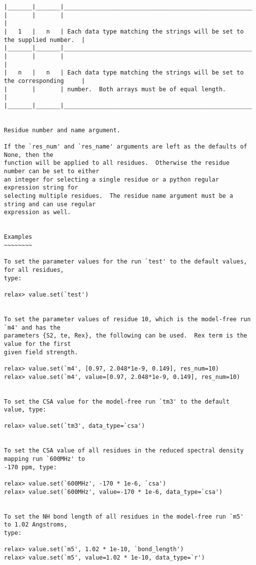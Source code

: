 {\begin{verbatim}
|_______|_______|__________________________________________________________________________|
|       |       |                                                                          |
|   1   |   n   | Each data type matching the strings will be set to the supplied number.  |
|_______|_______|__________________________________________________________________________|
|       |       |                                                                          |
|   n   |   n   | Each data type matching the strings will be set to the corresponding     |
|       |       | number.  Both arrays must be of equal length.                            |
|_______|_______|__________________________________________________________________________|


Residue number and name argument.

If the `res_num' and `res_name' arguments are left as the defaults of None, then the
function will be applied to all residues.  Otherwise the residue number can be set to either
an integer for selecting a single residue or a python regular expression string for
selecting multiple residues.  The residue name argument must be a string and can use regular
expression as well.


Examples
~~~~~~~~

To set the parameter values for the run `test' to the default values, for all residues,
type:

relax> value.set(`test')


To set the parameter values of residue 10, which is the model-free run `m4' and has the
parameters {S2, te, Rex}, the following can be used.  Rex term is the value for the first
given field strength.

relax> value.set(`m4', [0.97, 2.048*1e-9, 0.149], res_num=10)
relax> value.set(`m4', value=[0.97, 2.048*1e-9, 0.149], res_num=10)


To set the CSA value for the model-free run `tm3' to the default value, type:

relax> value.set(`tm3', data_type=`csa')


To set the CSA value of all residues in the reduced spectral density mapping run `600MHz' to
-170 ppm, type:

relax> value.set(`600MHz', -170 * 1e-6, `csa')
relax> value.set(`600MHz', value=-170 * 1e-6, data_type=`csa')


To set the NH bond length of all residues in the model-free run `m5' to 1.02 Angstroms,
type:

relax> value.set(`m5', 1.02 * 1e-10, `bond_length')
relax> value.set(`m5', value=1.02 * 1e-10, data_type=`r')



\end{verbatim}}
